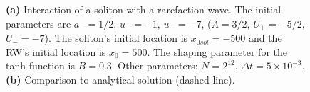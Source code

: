\documentclass[12pt]{article}
\numberwithin{equation}{section}
\begin{document}
\begin{figure}[h!]
\begin{subfigure}[b]{.45\textwidth}
         \caption{}
     \end{subfigure}
        \caption{\textbf{(a) }Interaction of a soliton with a rarefaction wave. The initial parameters are $a_- = 1/2$, $u_+ = - 1$, $u_- = -7$, ($A = 3/2$, $U_+ = -5/2$, $U_- = -7$). The soliton's initial location is $x_{0sol} = -500$ and the RW's initial location is $x_0 = 500$. The shaping parameter for the tanh function is $B = 0.3$. Other parameters: $N = 2^{12}$, $\Delta t = 5\times10^{-3}$. \textbf{(b)} Comparison to analytical solution (dashed line).} 
        \label{fig:comparison wider}
\end{figure}

\pagebreak



\end{document}
